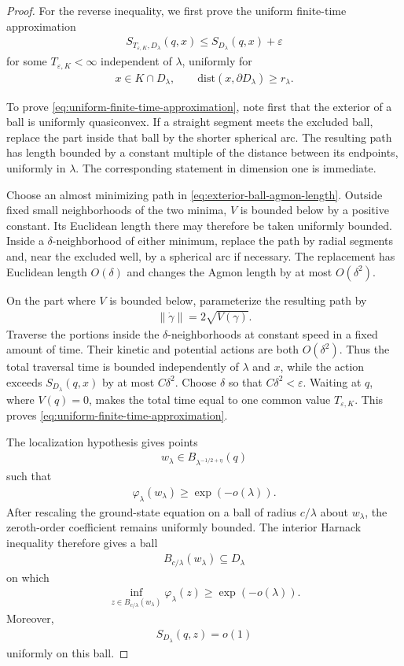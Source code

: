 \documentclass[a4paper,10pt]{article}
\numberwithin{equation}{section}
\theoremstyle{plain}
\theoremstyle{plain}
\theoremstyle{plain}
\theoremstyle{plain}
\theoremstyle{plain}
\theoremstyle{remark}
\theoremstyle{definition}
\newcommand\norm[1]{\left\lVert#1\right\rVert}
\newcommand{\vf}{\varphi}
\newcommand{\dist}{\mathrm{dist}}
\newcommand{\eq}[1]{\begin{align*}#1\end{align*}}
\newcommand{\eql}[1]{\begin{align}#1\end{align}}
\newcommand{\br}[1]{\left(#1\right)}
\begin{document}
\begin{proof}
For the reverse inequality, we first prove the uniform finite-time
approximation
\eql{
S_{T_{\varepsilon,K},D_\lambda}(q,x)
\leq
S_{D_\lambda}(q,x)
+
\varepsilon
\label{eq:uniform-finite-time-approximation}
}
for some $T_{\varepsilon,K}<\infty$ independent of $\lambda$, uniformly
for
\eq{
x\in K\cap D_\lambda,
\qquad
\dist(x,\partial D_\lambda)
\geq
r_\lambda.
}

To prove
\cref{eq:uniform-finite-time-approximation}, note first that the
exterior of a ball is uniformly quasiconvex. If a straight segment
meets the excluded ball, replace the part inside that ball by the
shorter spherical arc. The resulting path has length bounded by a
constant multiple of the distance between its endpoints, uniformly
in $\lambda$. The corresponding statement in dimension one is
immediate.

Choose an almost minimizing path in
\cref{eq:exterior-ball-agmon-length}. Outside fixed small
neighborhoods of the two minima, $V$ is bounded below by a positive
constant. Its Euclidean length there may therefore be taken uniformly
bounded. Inside a $\delta$-neighborhood of either minimum, replace
the path by radial segments and, near the excluded well, by a
spherical arc if necessary. The replacement has Euclidean length
$O(\delta)$ and changes the Agmon length by at most $O(\delta^2)$.

On the part where $V$ is bounded below, parameterize the resulting
path by
\eq{
\norm{\dot\gamma}
=
2\sqrt{V(\gamma)}.
}
Traverse the portions inside the $\delta$-neighborhoods at constant
speed in a fixed amount of time. Their kinetic and potential actions
are both $O(\delta^2)$. Thus the total traversal time is bounded
independently of $\lambda$ and $x$, while the action exceeds
$S_{D_\lambda}(q,x)$ by at most $C\delta^2$. Choose $\delta$ so that
$C\delta^2<\varepsilon$. Waiting at $q$, where $V(q)=0$, makes the
total time equal to one common value $T_{\varepsilon,K}$. This proves
\cref{eq:uniform-finite-time-approximation}.

The localization hypothesis gives points
\eq{
w_\lambda
\in
B_{\lambda^{-1/2+\eta}}(q)
}
such that
\eq{
\vf_\lambda(w_\lambda)
\geq
\exp\br{
-o(\lambda)
}.
}
After rescaling the ground-state equation on a ball of radius
$c/\lambda$ about $w_\lambda$, the zeroth-order coefficient remains
uniformly bounded. The interior Harnack inequality therefore gives a
ball
\eq{
B_{c/\lambda}(w_\lambda)
\subseteq
D_\lambda
}
on which
\eql{
\inf_{
z\in
B_{c/\lambda}(w_\lambda)
}
\vf_\lambda(z)
\geq
\exp\br{
-o(\lambda)
}.
\label{eq:exterior-ball-local-ground-state-lower-bound}
}
Moreover,
\eq{
S_{D_\lambda}(q,z)
=
o(1)
}
uniformly on this ball.


\end{proof}
\end{document}

